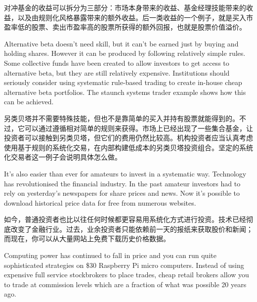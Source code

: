 \begin{chineseblock}对冲基金的收益可以拆分为三部分：市场本身带来的收益、基金经理技能带来的收益，以及由规则化风格暴露带来的额外收益。后一类收益的一个例子，就是买入市盈率低的股票、卖出市盈率高的股票所获得的额外回报，也就是股票价值溢价。\end{chineseblock}

\bipairgap

\begin{englishblock} Alternative beta doesn't need skill, but it can't be earned just by buying and holding shares. However it can be produced by following relatively simple rules. Some collective funds have been created to allow investors to get access to alternative beta, but they are still relatively expensive. Institutions should seriously consider using systematic rule-based trading to create in-house cheap alternative beta portfolios. The staunch systems trader example shows how this can be achieved. \end{englishblock}

\begin{chineseblock}另类贝塔并不需要特殊技能，但也不是靠简单的买入并持有股票就能得到的。不过，它可以通过遵循相对简单的规则来获得。市场上已经出现了一些集合基金，让投资者可以接触到另类贝塔，但它们的费用仍然比较高。机构投资者应当认真考虑使用基于规则的系统化交易，在内部构建低成本的另类贝塔投资组合。坚定的系统化交易者这一例子会说明具体怎么做。\end{chineseblock}

\bipairgap

\begin{englishblock} It's also easier than ever for amateurs to invest in a systematic way. Technology has revolutionised the financial industry. In the past amateur investors had to rely on yesterday's newspapers for share prices and news. Now it's possible to download historical price data for free from numerous websites. \end{englishblock}

\begin{chineseblock}如今，普通投资者也比以往任何时候都更容易用系统化方式进行投资。技术已经彻底改变了金融行业。过去，业余投资者只能依赖前一天的报纸来获取股价和新闻；而现在，你可以从大量网站上免费下载历史价格数据。\end{chineseblock}

\bipairgap

\begin{englishblock} Computing power has continued to fall in price and you can run quite sophisticated strategies on \$30 Raspberry Pi micro computers. Instead of using expensive full service stockbrokers to place trades, cheap retail brokers allow you to trade at commission levels which are a fraction of what was possible 20 years ago. \end{englishblock}

